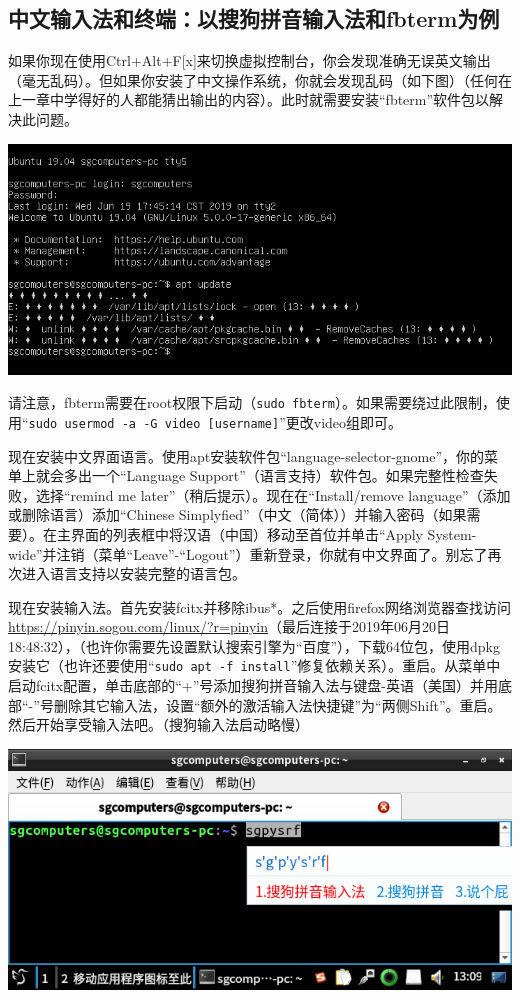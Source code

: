 \subsection{中文输入法和终端：以搜狗拼音输入法和fbterm为例}
如果你现在使用Ctrl+Alt+F[x]来切换虚拟控制台，你会发现准确无误英文输出（毫无乱码）。但如果你安装了中文操作系统，你就会发现乱码（如下图）（任何在上一章中学得好的人都能猜出输出的内容）。此时就需要安装“fbterm”软件包以解决此问题。
\begin{center}
	\includegraphics[scale=0.8]{pic/fbt1}
\end{center} \par
请注意，fbterm需要在root权限下启动（\verb|sudo fbterm|）。如果需要绕过此限制，使用“\verb|sudo usermod -a -G video [username]|”更改video组即可。\par
现在安装中文界面语言。使用apt安装软件包“language-selector-gnome”，你的菜单上就会多出一个“Language Support”（语言支持）软件包。如果完整性检查失败，选择“remind me later”（稍后提示）。现在在“Install/remove language”（添加或删除语言）添加“Chinese Simplyfied”（中文（简体））并输入密码（如果需要）。在主界面的列表框中将汉语（中国）移动至首位并单击“Apply System-wide”并注销（菜单“Leave”-“Logout”）重新登录，你就有中文界面了。别忘了再次进入语言支持以安装完整的语言包。\par
现在安装输入法。首先安装fcitx并移除ibus*。之后使用firefox网络浏览器查找访问\url{https://pinyin.sogou.com/linux/?r=pinyin}（最后连接于2019年06月20日18:48:32），（也许你需要先设置默认搜索引擎为“百度”），下载64位包，使用dpkg安装它（也许还要使用“\verb|sudo apt -f install|”修复依赖关系）。重启。从菜单中启动fcitx配置，单击底部的“+”号添加搜狗拼音输入法与键盘-英语（美国）并用底部“-”号删除其它输入法，设置“额外的激活输入法快捷键”为“两侧Shift”。重启。然后开始享受输入法吧。（搜狗输入法启动略慢）
\begin{center}
	\includegraphics[scale=0.7]{pic/fbt2}
\end{center}
